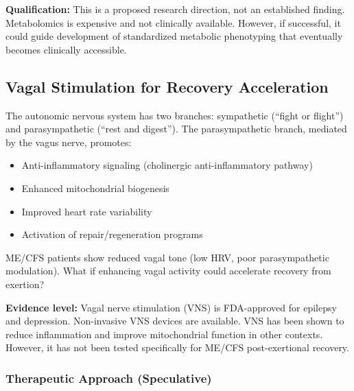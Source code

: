\textbf{Qualification:} This is a proposed research direction, not an established finding. Metabolomics is expensive and not clinically available. However, if successful, it could guide development of standardized metabolic phenotyping that eventually becomes clinically accessible.

\subsection{Vagal Stimulation for Recovery Acceleration}
\label{subsec:vagal-recovery}

\begin{hypothesis}
The autonomic nervous system has two branches: sympathetic (``fight or flight'') and parasympathetic (``rest and digest''). The parasympathetic branch, mediated by the vagus nerve, promotes:
\begin{itemize}
    \item Anti-inflammatory signaling (cholinergic anti-inflammatory pathway)
    \item Enhanced mitochondrial biogenesis
    \item Improved heart rate variability
    \item Activation of repair/regeneration programs
\end{itemize}

ME/CFS patients show reduced vagal tone (low HRV, poor parasympathetic modulation). What if enhancing vagal activity could accelerate recovery from exertion?

\textbf{Evidence level:} Vagal nerve stimulation (VNS) is FDA-approved for epilepsy and depression. Non-invasive VNS devices are available. VNS has been shown to reduce inflammation and improve mitochondrial function in other contexts. However, it has not been tested specifically for ME/CFS post-exertional recovery.
\end{hypothesis}

\subsubsection{Therapeutic Approach (Speculative)}

